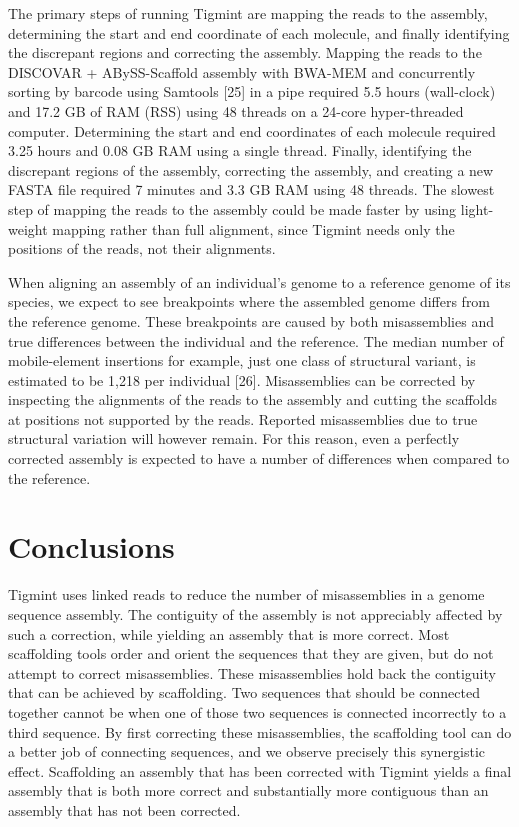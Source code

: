\documentclass{bmcart}
\begin{document}
The primary steps of running Tigmint are mapping the reads to the assembly, determining the start and end coordinate of each molecule, and finally identifying the discrepant regions and correcting the assembly. Mapping the reads to the DISCOVAR + ABySS-Scaffold assembly with BWA-MEM and concurrently sorting by barcode using Samtools {[}25{]} in a pipe required 5.5 hours (wall-clock) and 17.2 GB of RAM (RSS) using 48 threads on a 24-core hyper-threaded computer. Determining the start and end coordinates of each molecule required 3.25 hours and 0.08 GB RAM using a single thread. Finally, identifying the discrepant regions of the assembly, correcting the assembly, and creating a new FASTA file required 7 minutes and 3.3 GB RAM using 48 threads. The slowest step of mapping the reads to the assembly could be made faster by using light-weight mapping rather than full alignment, since Tigmint needs only the positions of the reads, not their alignments.

When aligning an assembly of an individual's genome to a reference genome of its species, we expect to see breakpoints where the assembled genome differs from the reference genome. These breakpoints are caused by both misassemblies and true differences between the individual and the reference. The median number of mobile-element insertions for example, just one class of structural variant, is estimated to be 1,218 per individual {[}26{]}. Misassemblies can be corrected by inspecting the alignments of the reads to the assembly and cutting the scaffolds at positions not supported by the reads. Reported misassemblies due to true structural variation will however remain. For this reason, even a perfectly corrected assembly is expected to have a number of differences when compared to the reference.

\hypertarget{conclusions}{%
\section*{Conclusions}\label{conclusions}}

Tigmint uses linked reads to reduce the number of misassemblies in a genome sequence assembly. The contiguity of the assembly is not appreciably affected by such a correction, while yielding an assembly that is more correct. Most scaffolding tools order and orient the sequences that they are given, but do not attempt to correct misassemblies. These misassemblies hold back the contiguity that can be achieved by scaffolding. Two sequences that should be connected together cannot be when one of those two sequences is connected incorrectly to a third sequence. By first correcting these misassemblies, the scaffolding tool can do a better job of connecting sequences, and we observe precisely this synergistic effect. Scaffolding an assembly that has been corrected with Tigmint yields a final assembly that is both more correct and substantially more contiguous than an assembly that has not been corrected.
\end{document}

